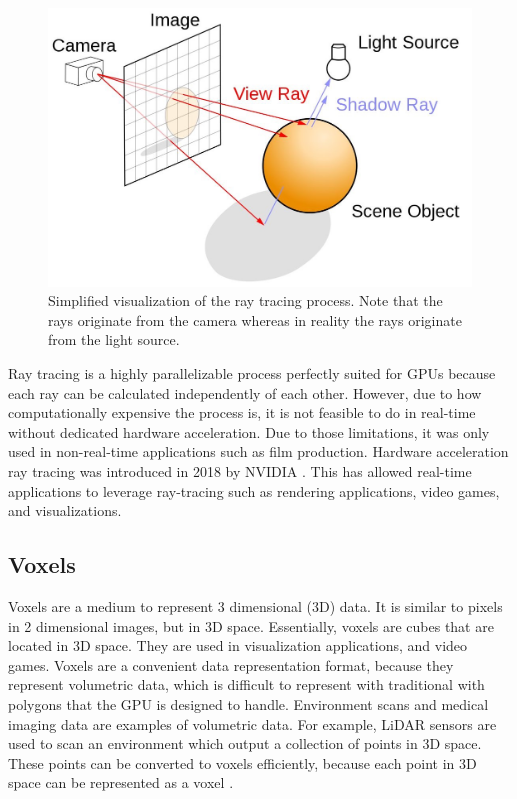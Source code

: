 \documentclass[12pt]{article}
\begin{document}
\begin{figure}[H]
    \begin{center}
        \includegraphics[scale=0.22]{RayTracingImage}
    \end{center}
    \caption{Simplified visualization of the ray tracing process. Note that the rays originate from the camera whereas in reality the rays originate from the light source.}
    \label{fig:RayTracingImage}
\end{figure}

Ray tracing is a highly parallelizable process perfectly suited for GPUs because each ray can be calculated independently of each other.
However, due to how computationally expensive the
process is, it is not feasible to do in real-time without dedicated hardware
acceleration. Due to those limitations, it was only used in non-real-time
applications such as film production. Hardware acceleration ray tracing was introduced in 2018 by NVIDIA \parencite{NVIDIA:DXR-Intro}.
This has allowed real-time applications to leverage ray-tracing such as rendering applications, video games, and visualizations.

\subsection{Voxels}

Voxels are a medium to represent 3 dimensional (3D) data. It is similar to pixels in 2 dimensional images,
but in 3D space. Essentially, voxels are cubes that are located in 3D space.
They are used in visualization applications, and video games.
Voxels are a convenient data representation format, because they represent
volumetric data, which is difficult to represent with traditional with polygons that the GPU is designed to handle.
Environment scans and medical imaging data are examples of volumetric data.
For example, LiDAR sensors are used to scan an environment which output a collection of points in 3D space.
These points can be converted to voxels efficiently, because each point in 3D space can be represented as a voxel \parencite{NOS:LiDAR}.
\end{document}
